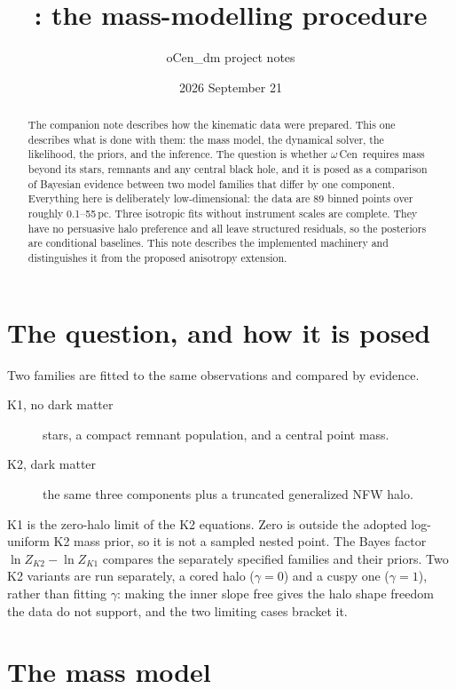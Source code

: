 \documentclass[11pt,a4paper]{article}
\title{\ocen: the mass-modelling procedure}
\author{oCen\_dm project notes}
\date{2026 September 21}
\newcommand{\ocen}{$\omega$\,Cen}
\begin{document}
\maketitle

\begin{abstract}
The companion note describes how the kinematic data were prepared. This one describes what is
done with them: the mass model, the dynamical solver, the likelihood, the priors, and the
inference. The question is whether \ocen\ requires mass beyond its stars, remnants and any
central black hole, and it is posed as a comparison of Bayesian evidence between two model
families that differ by one component. Everything here is deliberately low-dimensional: the
data are 89 binned points over roughly 0.1--55\,pc. Three isotropic fits without instrument
scales are complete. They have no persuasive halo preference and all leave structured
residuals, so the posteriors are conditional baselines. This note describes the implemented
machinery and distinguishes it from the proposed anisotropy extension.
\end{abstract}

\section{The question, and how it is posed}

Two families are fitted to the same observations and compared by evidence.

\begin{description}
\item[K1, no dark matter] stars, a compact remnant population, and a central point mass.
\item[K2, dark matter] the same three components plus a truncated generalized NFW halo.
\end{description}

K1 is the zero-halo limit of the K2 equations. Zero is outside the adopted log-uniform
K2 mass prior, so it is not a sampled nested point. The Bayes factor
$\ln Z_{K2}-\ln Z_{K1}$ compares the separately specified families and their priors. Two K2 variants are run separately,
a cored halo ($\gamma=0$) and a cuspy one ($\gamma=1$), rather than fitting $\gamma$: making
the inner slope free gives the halo shape freedom the data do not support, and the two
limiting cases bracket it.

\section{The mass model}
\end{document}
